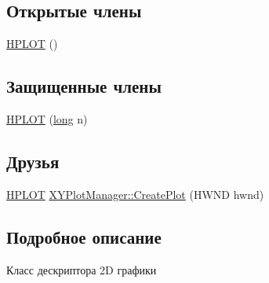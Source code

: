 \subsection*{Открытые члены}
\begin{DoxyCompactItemize}
\item 
\hyperlink{classxyplot_1_1_h_p_l_o_t_a424db5c2119d13d2d3dbb002a0ac1a88}{H\-P\-L\-O\-T} ()
\end{DoxyCompactItemize}
\subsection*{Защищенные члены}
\begin{DoxyCompactItemize}
\item 
\hyperlink{classxyplot_1_1_h_p_l_o_t_a616541018b4726d067f5f0f603a7b728}{H\-P\-L\-O\-T} (\hyperlink{namespacexyplot_a27bc71b0bdfac09495e7e531d8a918c5}{long} n)
\end{DoxyCompactItemize}
\subsection*{Друзья}
\begin{DoxyCompactItemize}
\item 
\hyperlink{classxyplot_1_1_h_p_l_o_t}{H\-P\-L\-O\-T} \hyperlink{classxyplot_1_1_h_p_l_o_t_a2dc937508f64b152af97927dca16abfb}{X\-Y\-Plot\-Manager\-::\-Create\-Plot} (H\-W\-N\-D hwnd)
\end{DoxyCompactItemize}


\subsection{Подробное описание}
Класс дескриптора 2\-D графики 

